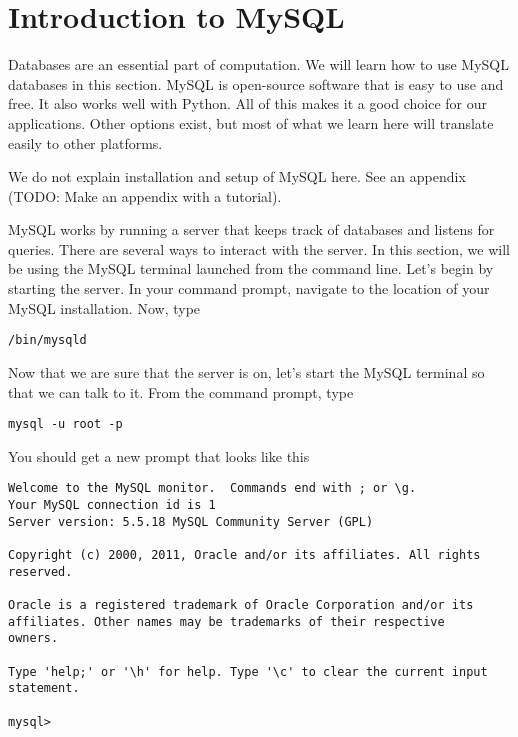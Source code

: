 \label{lab:DbEssentials}

\section*{Introduction to MySQL}

Databases are an essential part of computation.  We will learn how to use MySQL databases in this section.  MySQL is open-source software that is easy to use and free.  It also works well with Python.  All of this makes it a good choice for our applications.  Other options exist, but most of what we learn here will translate easily to other platforms.

We do not explain installation and setup of MySQL here.  See an appendix (TODO:  Make an appendix with a tutorial).

MySQL works by running a server that keeps track of databases and listens for queries.  There are several ways to interact with the server.  In this section, we will be using the MySQL terminal launched from the command line.  Let's begin by starting the server.  In your command prompt, navigate to the location of your MySQL installation. Now, type

\begin{lstlisting}[style=ShellInput]
/bin/mysqld
\end{lstlisting}

Now that we are sure that the server is on, let's start the MySQL terminal so that we can talk to it.  From the command prompt, type

\begin{lstlisting}[style=ShellInput]
mysql -u root -p
\end{lstlisting}

You should get a new prompt that looks like this

\begin{lstlisting}
Welcome to the MySQL monitor.  Commands end with ; or \g.
Your MySQL connection id is 1
Server version: 5.5.18 MySQL Community Server (GPL)

Copyright (c) 2000, 2011, Oracle and/or its affiliates. All rights reserved.

Oracle is a registered trademark of Oracle Corporation and/or its
affiliates. Other names may be trademarks of their respective
owners.

Type 'help;' or '\h' for help. Type '\c' to clear the current input statement.

mysql> 
\end{lstlisting}

